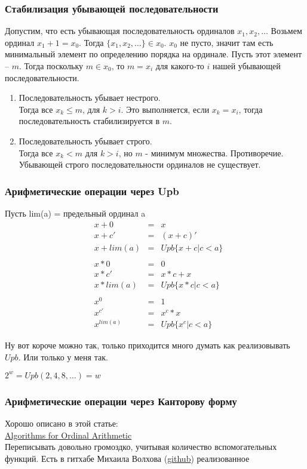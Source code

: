 \subsubsection{Стабилизация убывающей последовательности}
\label{sec-16-2-1}
Допустим, что есть убывающая последовательность ординалов $x_1, x_2, \dotsc$ Возьмем ординал $x_1 + 1 = x_0$. Тогда $\{x_1, x_2, \dots \} \in x_0$. $x_0$ не пусто, значит там есть минимальный элемент по определению порядка на ординале. Пусть этот элемент -- $m$. Тогда поскольку $m \in x_0$, то $m = x_i$ для какого-то $i$ нашей убывающей последовательности.
\begin{enumerate}
\item Последовательность убывает нестрого.\\
Тогда все $x_k \leq m$, для $k > i$. Это выполняется, если $x_k = x_i$, тогда последовательность стабилизируется в $m$.
\item Последовательность убывает строго.\\
Тогда все $x_k < m$ для $k > i$, но $m$ - минимум множества. Противоречие.\\
Убывающей строго последовательности ординалов не существует.
\end{enumerate}
\subsubsection{Арифметические операции через Upb}
\label{sec-16-2-2}
Пусть lim(a) = предельный ординал a
\begin{align*}
&x + 0 &= &x \\
&x + c' &= &(x + c)' \\
&x + lim(a) &= &Upb\{x + c | c < a\} \\
\\
&x * 0 &= &0 \\
&x * c' &= &x * c + x \\
&x * lim(a) &= &Upb\{x * c | c < a\} \\
\\
&x^{0} &= &1\\
&x^{c'} &= &x^c * x\\
&x^{lim(a)} &= &Upb\{x^c | c < a\}
\end{align*}

Ну вот короче можно так, только приходится много думать как реализовывать $Upb$. Или только у меня так.

$2^{w} = Upb(2, 4, 8, \dots ) = w$
\subsubsection{Арифметические операции через Канторову форму}
\label{sec-16-2-3}
Хорошо описано в этой статье:\\
\href{http://www.google.ru/url?sa=t&rct=j&q=&esrc=s&source=web&cd=1&ved=0CB4QFjAA&url=http://www.ccs.neu.edu/home/pete/pub/cade-algorithms-ordinal-arithmetic.pdf&ei=FDW6\lor JOYNuvXyQPd0ILQBQ&usg=AFQjCNENBOBOdKbbqBYN3iFhmAu_jFD2Sw&sig2=1UISFzJ_21I8f1YScX7Tkw&bvm=bv.83829542,d.bGQ&cad=rjt}{Algorithms for Ordinal Arithmetic}\\
Переписывать довольно громоздко, учитывая количество вспомогательных функций. Есть в гитхабе Михаила Волхова (\href{https://github.com/volhovM/mathlogic}{github}) реализованное

